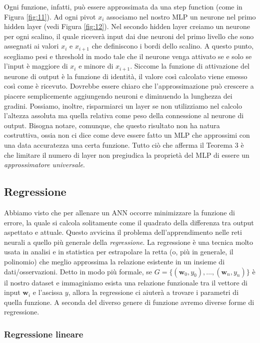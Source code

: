 \documentclass[10pt,a4paper]{article}
\newcommand{\ww}{\mathbf{w}}
\begin{document}
Ogni funzione, infatti, può essere approssimata da una step function (come in Figura \ref{fig:11}). Ad ogni pivot $x_i$ associamo nel nostro MLP un neurone nel primo hidden layer (vedi Figura \ref{fig:12}). Nel secondo hidden layer creiamo un neurone per ogni scalino, il quale riceverà input dai due neuroni del primo livello che sono assegnati ai valori $x_i$ e $x_{i+1}$ che definiscono i bordi dello scalino. A questo punto, scegliamo pesi e threshold in modo tale che il neurone venga attivato se e solo se l'input è maggiore di $x_i$ e minore di $x_{i+1}$. Siccome la funzione di attivazione del neurone di output è la funzione di identità, il valore così calcolato viene emesso così come è ricevuto. 
Dovrebbe essere chiaro che l'approssimazione può crescere a piacere semplicemente aggiungendo neuroni e diminuendo la lunghezza dei gradini. Possiamo, inoltre, risparmiarci un layer se non utilizziamo nel calcolo l'altezza assoluta ma quella relativa come peso della connessione al neurone di output.
Bisogna notare, comunque, che questo risultato non ha natura costruttiva, ossia non ci dice come deve essere fatto un MLP che approssimi con una data accuratezza una certa funzione. Tutto ciò che afferma il Teorema 3 è che limitare il numero di layer non pregiudica la proprietà del MLP di essere un \emph{approssimatore universale}.

\subsection{Regressione}

Abbiamo visto che per allenare un ANN occorre minimizzare la funzione di errore, la quale si calcola solitamente come il quadrato della differenza tra output aspettato e attuale. Questo avvicina il problema dell'apprendimento nelle reti neurali a quello più generale della \emph{regressione}. La regressione è una tecnica molto usata in analisi e in statistica per estrapolare la retta (o, più in generale, il polinomio) che meglio approssima la relazione esistente in un insieme di dati/osservazioni. Detto in modo più formale, se $G = \{(\ww_0,y_0), \dots, (\ww_n,y_n)\}$ è il nostro dataset e immaginiamo esista una relazione funzionale tra il vettore di input $\ww_i$ e l'ascissa $y$, allora la regressione ci aiuterà a trovare i parametri di quella funzione. A seconda del diverso genere di funzione avremo diverse forme di regressione.

\subsubsection{Regressione lineare}
\end{document}
